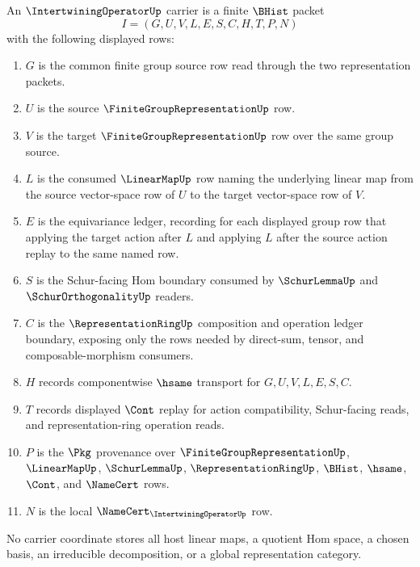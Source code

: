 \begin{definition}
\label{def:intertwining-operator-carrier}
An $\IntertwiningOperatorUp$ carrier is a finite $\BHist$ packet
$$
I=(G,U,V,L,E,S,C,H,T,P,N)
$$
with the following displayed rows:
\begin{enumerate}
\item $G$ is the common finite group source row read through the two representation packets.
\item $U$ is the source $\FiniteGroupRepresentationUp$ row.
\item $V$ is the target $\FiniteGroupRepresentationUp$ row over the same group source.
\item $L$ is the consumed $\LinearMapUp$ row naming the underlying linear map from the source vector-space row of $U$ to the target vector-space row of $V$.
\item $E$ is the equivariance ledger, recording for each displayed group row that applying the target action after $L$ and applying $L$ after the source action replay to the same named row.
\item $S$ is the Schur-facing Hom boundary consumed by $\SchurLemmaUp$ and $\SchurOrthogonalityUp$ readers.
\item $C$ is the $\RepresentationRingUp$ composition and operation ledger boundary, exposing only the rows needed by direct-sum, tensor, and composable-morphism consumers.
\item $H$ records componentwise $\hsame$ transport for $G,U,V,L,E,S,C$.
\item $T$ records displayed $\Cont$ replay for action compatibility, Schur-facing reads, and representation-ring operation reads.
\item $P$ is the $\Pkg$ provenance over $\FiniteGroupRepresentationUp$, $\LinearMapUp$, $\SchurLemmaUp$, $\RepresentationRingUp$, $\BHist$, $\hsame$, $\Cont$, and $\NameCert$ rows.
\item $N$ is the local $\NameCert_{\IntertwiningOperatorUp}$ row.
\end{enumerate}
No carrier coordinate stores all host linear maps, a quotient Hom space, a chosen basis, an irreducible decomposition, or a global representation category.
\end{definition}


